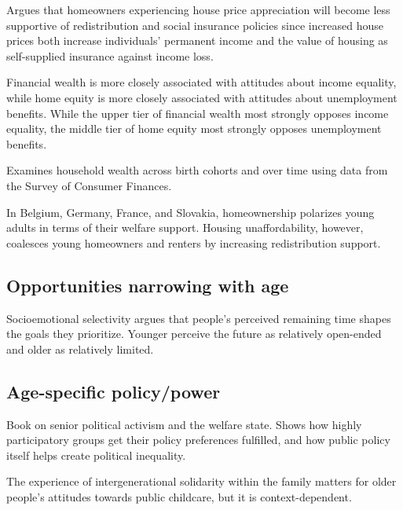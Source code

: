 \documentclass{article}
\newcommand{\citem}[1]{\medskip \noindent \textbf{\cite*{#1}}}
\begin{document}
\citem{ansell2014political}

Argues that homeowners experiencing house price appreciation will become less supportive of redistribution and social insurance policies since increased house prices both increase individuals’ permanent income and the value of housing as self-supplied insurance against income loss.

\citem{steele2020wealth}

Financial wealth is more closely associated with attitudes about income equality, while home equity is more closely associated with attitudes about unemployment benefits. While the upper tier of financial wealth most strongly opposes income equality, the middle tier of home equity most strongly opposes unemployment benefits.

\citem{gale2020wealth}

Examines household wealth across birth cohorts and over time using data from the Survey of Consumer Finances.

\citem{furtado2025housing}

In Belgium, Germany, France, and Slovakia, homeownership polarizes young adults in terms of their welfare support. Housing unaffordability, however, coalesces young homeowners and renters by increasing redistribution support.

\subsection{Opportunities narrowing with age}

\citem{carstensen1999taking}

Socioemotional selectivity argues that people's perceived remaining time shapes the goals they prioritize. Younger perceive the future as relatively open-ended and older as relatively limited.

\subsection{Age-specific policy/power}

\citem{campbell2003policies}

Book on senior political activism and the welfare state. Shows how highly participatory groups get their policy preferences fulfilled, and how public policy itself helps create political inequality.

\citem{goerres2010age}

The experience of intergenerational solidarity within the family matters for older people’s attitudes towards public childcare, but it is context-dependent.
\end{document}

